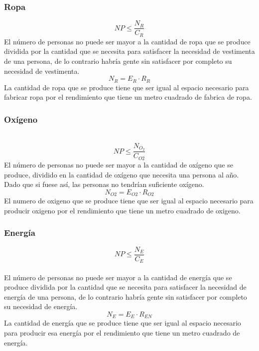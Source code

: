 \documentclass[12pt]{report}
\begin{document}
\subsubsection*{Ropa}
$$NP \leq \frac{N_{R}}{C_{R}}$$
El n\'umero de personas no puede ser mayor a la cantidad de ropa que se produce dividida por la cantidad que se necesita para satisfacer la necesidad de vestimenta de una persona, de lo contrario habr\'ia gente sin satisfacer por completo su necesidad de vestimenta.
\\
$$N_{R} = E_{R} \cdot R_{R}$$
La cantidad de ropa que se produce tiene que ser igual al espacio necesario para fabricar ropa por el rendimiento que tiene un metro cuadrado de fabrica de ropa.
\\

\newpage
\subsubsection*{Ox\'igeno}
\\
$$NP \leq \frac{N_{O}_{2}}{C_{O2}}  $$
El n\'umero de personas no puede ser mayor a la cantidad de ox\'igeno que se produce, dividido en la cantidad de ox\'igeno que necesita una persona al a\~no. Dado que si fuese as\'i, las personas no tendr\'ian suficiente ox\'igeno.
\\
$$N_{O2} = E_{O2}\cdot R_{O2}$$
El numero de oxigeno que se produce tiene que ser igual al espacio necesario para producir oxigeno por el rendimiento que tiene un metro cuadrado de oxigeno.
\\

\subsubsection*{Energ\'ia}
$$NP \leq \frac{N_{E}}{C_{E}}$$
\\
El n\'umero de personas no puede ser mayor a la cantidad de energ\'ia que se produce dividida por la cantidad que se necesita para satisfacer la necesidad de energ\'ia de una persona, de lo contrario habr\'ia gente sin satisfacer por completo su necesidad de energ\'ia.
$$N_{E} = E_{E} \cdot R_{EN}$$
La cantidad de energ\'ia que se produce tiene que ser igual al espacio necesario para producir esa energ\'ia por el rendimiento que tiene un metro cuadrado de energ\'ia.
\end{document}
